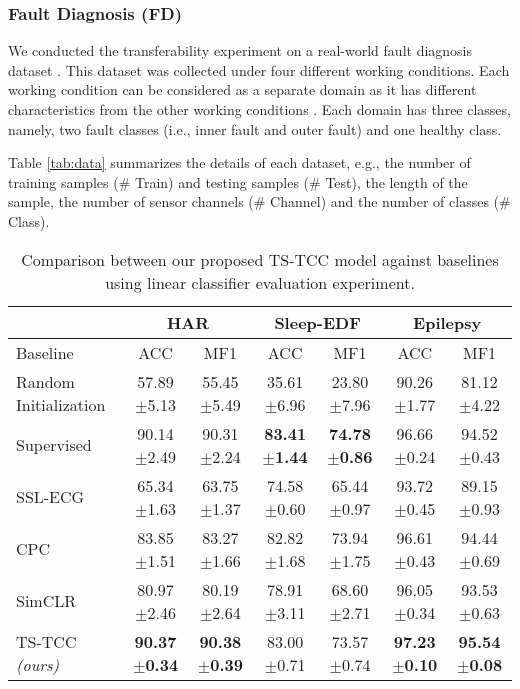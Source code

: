 \documentclass{article}
\begin{document}
\subsubsection{Fault Diagnosis (FD)}
We conducted the transferability experiment on a real-world fault diagnosis dataset \cite{lessmeier2016condition}. This dataset was collected under four different working conditions. Each working condition can be considered as a separate domain as it has different characteristics from the other working conditions \cite{ragab2020adversarial}.
Each domain has three classes, namely, two fault classes (i.e., inner fault and outer fault) and one healthy class. 


Table \ref{tab:data} summarizes the details of each dataset, e.g., the number of training samples (\# Train) and testing samples (\# Test), the length of the sample, the number of sensor channels (\# Channel) and the number of classes (\# Class).

\begin{table*}\centering

\begin{tabular}{@{}l|cc|cc|cc@{}}
\toprule
 & \multicolumn{2}{c|}{HAR} & \multicolumn{2}{c|}{Sleep-EDF} & \multicolumn{2}{c}{Epilepsy} \\ \midrule
Baseline       & ACC           & MF1           & ACC           & MF1           & ACC           & MF1           \\ \midrule

Random Initialization  & 57.89$\pm$5.13 & 55.45$\pm$5.49 & 35.61$\pm$6.96 & 23.80$\pm$7.96 & 90.26$\pm$1.77 & 81.12$\pm$4.22 \\ 

Supervised      & 90.14$\pm$2.49 & 90.31$\pm$2.24 & \textbf{83.41$\pm$1.44} & \textbf{74.78$\pm$0.86} & 96.66$\pm$0.24 & 94.52$\pm$0.43 \\

SSL-ECG \cite{ecg_emotion_rec}  & 65.34$\pm$1.63 & 63.75$\pm$1.37 & 74.58$\pm$0.60 & 65.44$\pm$0.97 & 93.72$\pm$0.45 & 89.15$\pm$0.93 \\

CPC \cite{oord2018representation} & 83.85$\pm$1.51 & 83.27$\pm$1.66 & 82.82$\pm$1.68 & 73.94$\pm$1.75 & 96.61$\pm$0.43 & 94.44$\pm$0.69 \\ 

SimCLR \cite{chen2020simple} & 80.97$\pm$2.46 & 80.19$\pm$2.64 & 78.91$\pm$3.11 & 68.60$\pm$2.71  & 96.05$\pm$0.34 & 93.53$\pm$0.63 \\


TS-TCC \textit{(ours)} & \textbf{90.37$\pm$0.34} & \textbf{90.38$\pm$0.39} & 83.00$\pm$0.71 & 73.57$\pm$0.74 & \textbf{97.23$\pm$0.10} & \textbf{95.54$\pm$0.08} \\ 
\bottomrule

\end{tabular}
\caption{Comparison between our proposed TS-TCC model against baselines using linear classifier evaluation experiment.}


\label{tbl:fine_linear}
\end{table*}
 
\end{document}
